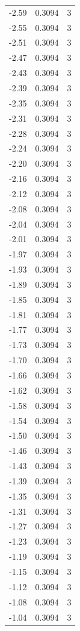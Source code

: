 \begin{longtable}{lrr}
  -2.59 & 0.3094 & 3 \\
  -2.55 & 0.3094 & 3 \\
  -2.51 & 0.3094 & 3 \\
  -2.47 & 0.3094 & 3 \\
  -2.43 & 0.3094 & 3 \\
  -2.39 & 0.3094 & 3 \\
  -2.35 & 0.3094 & 3 \\
  -2.31 & 0.3094 & 3 \\
  -2.28 & 0.3094 & 3 \\
  -2.24 & 0.3094 & 3 \\
  -2.20 & 0.3094 & 3 \\
  -2.16 & 0.3094 & 3 \\
  -2.12 & 0.3094 & 3 \\
  -2.08 & 0.3094 & 3 \\
  -2.04 & 0.3094 & 3 \\
  -2.01 & 0.3094 & 3 \\
  -1.97 & 0.3094 & 3 \\
  -1.93 & 0.3094 & 3 \\
  -1.89 & 0.3094 & 3 \\
  -1.85 & 0.3094 & 3 \\
  -1.81 & 0.3094 & 3 \\
  -1.77 & 0.3094 & 3 \\
  -1.73 & 0.3094 & 3 \\
  -1.70 & 0.3094 & 3 \\
  -1.66 & 0.3094 & 3 \\
  -1.62 & 0.3094 & 3 \\
  -1.58 & 0.3094 & 3 \\
  -1.54 & 0.3094 & 3 \\
  -1.50 & 0.3094 & 3 \\
  -1.46 & 0.3094 & 3 \\
  -1.43 & 0.3094 & 3 \\
  -1.39 & 0.3094 & 3 \\
  -1.35 & 0.3094 & 3 \\
  -1.31 & 0.3094 & 3 \\
  -1.27 & 0.3094 & 3 \\
  -1.23 & 0.3094 & 3 \\
  -1.19 & 0.3094 & 3 \\
  -1.15 & 0.3094 & 3 \\
  -1.12 & 0.3094 & 3 \\
  -1.08 & 0.3094 & 3 \\
  -1.04 & 0.3094 & 3 \\

\end{longtable}
